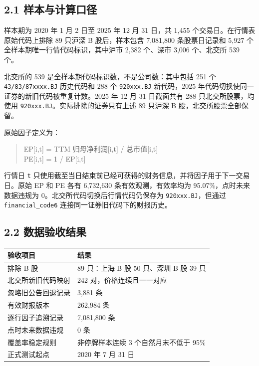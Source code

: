 \documentclass[UTF8,a4paper,11pt]{ctexart}
\begin{document}
\subsection*{2.1 样本与计算口径}

样本期为 2020 年 1 月 2 日至 2025 年 12 月 31 日，共 1,455 个交易日。在行情表原始代码上排除 89 只沪深 B 股后，样本包含 7,081,800 条股票日记录和 5,927 个全样本期唯一行情代码标识，其中沪市 2,382 个、深市 3,006 个、北交所 539 个。

北交所的 539 是全样本期代码标识数，不是公司数：其中包括 251 个 \texttt{43/83/87xxxx.BJ} 历史代码和 288 个 \texttt{920xxx.BJ} 新代码，2025 年代码切换使同一证券的新旧代码被重复计数。2025 年 12 月 31 日截面共有 288 只北交所股票，均使用 \texttt{920xxx.BJ}。实际排除的证券只有上述 89 只沪深 B 股，北交所股票全部保留。

原始因子定义为：

\begin{quote}\ttfamily\small
EP[i,t] = TTM 归母净利润[i,t] / 总市值[i,t]\\
PE[i,t] = 1 / EP[i,t]\\
\end{quote}

行情日 \texttt{t} 只使用截至当日结束前已经可获得的财务信息，并将因子用于下一交易日。原始 EP 和 PE 各有 6,732,630 条有效观测，有效率均为 95.07\%，点时未来数据违规为 0。北交所代码切换后行情代码仍保存为 \texttt{920xxx.BJ}，但通过 \texttt{financial\_code6} 连接同一证券旧代码下的财报历史。

{}
\subsection*{2.2 数据验收结果}

\begin{table}[htbp]
\centering
\begin{tabularx}{\textwidth}{@{}YY@{}}
\toprule
验收项目 & 结果 \\
\midrule
排除 B 股 & 89 只：上海 B 股 50 只、深圳 B 股 39 只 \\
北交所新旧代码映射 & 242 对，价格连续且一一对应 \\
忽略旧公告回退记录 & 3,881 条 \\
有效财报版本 & 262,984 条 \\
逐行因子追溯记录 & 7,081,800 条 \\
点时未来数据违规 & 0 条 \\
覆盖率稳定规则 & 非停牌样本连续 3 个自然月末不低于 95\% \\
正式测试起点 & 2020 年 7 月 31 日 \\
\bottomrule
\end{tabularx}
\end{table}
\end{document}
